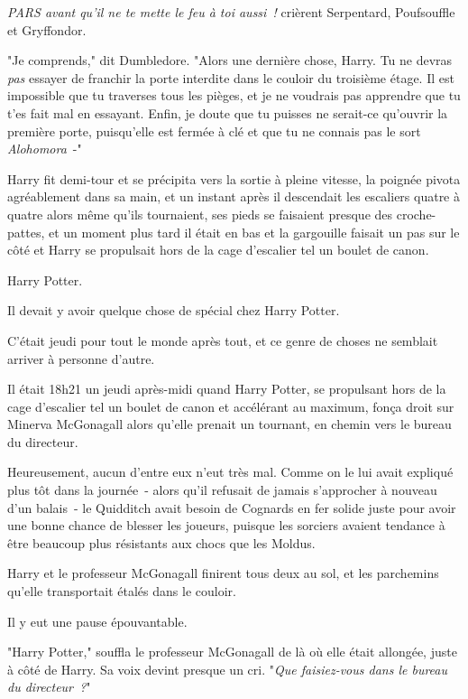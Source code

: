 \emph{PARS avant qu'il ne te mette le feu à toi aussi~!} crièrent Serpentard, Poufsouffle et Gryffondor.

"Je comprends," dit Dumbledore. "Alors une dernière chose, Harry. Tu ne devras \emph{pas} essayer de franchir la porte interdite dans le couloir du troisième étage. Il est impossible que tu traverses tous les pièges, et je ne voudrais pas apprendre que tu t'es fait mal en essayant. Enfin, je doute que tu puisses ne serait-ce qu'ouvrir la première porte, puisqu'elle est fermée à clé et que tu ne connais pas le sort \emph{Alohomora}~-"

Harry fit demi-tour et se précipita vers la sortie à pleine vitesse, la poignée pivota agréablement dans sa main, et un instant après il descendait les escaliers quatre à quatre alors même qu'ils tournaient, ses pieds se faisaient presque des croche-pattes, et un moment plus tard il était en bas et la gargouille faisait un pas sur le côté et Harry se propulsait hors de la cage d'escalier tel un boulet de canon.

\later

Harry Potter.

Il devait y avoir quelque chose de spécial chez Harry Potter.

C'était jeudi pour tout le monde après tout, et ce genre de choses ne semblait arriver à personne d'autre.

Il était 18h21 un jeudi après-midi quand Harry Potter, se propulsant hors de la cage d'escalier tel un boulet de canon et accélérant au maximum, fonça droit sur Minerva McGonagall alors qu'elle prenait un tournant, en chemin vers le bureau du directeur.

Heureusement, aucun d'entre eux n'eut très mal. Comme on le lui avait expliqué plus tôt dans la journée~- alors qu'il refusait de jamais s'approcher à nouveau d'un balais~- le Quidditch avait besoin de Cognards en fer solide juste pour avoir une bonne chance de blesser les joueurs, puisque les sorciers avaient tendance à être beaucoup plus résistants aux chocs que les Moldus.

Harry et le professeur McGonagall finirent tous deux au sol, et les parchemins qu'elle transportait étalés dans le couloir.

Il y eut une pause épouvantable.

"Harry Potter," souffla le professeur McGonagall de là où elle était allongée, juste à côté de Harry. Sa voix devint presque un cri. "\emph{Que faisiez-vous dans le bureau du directeur~?}"

